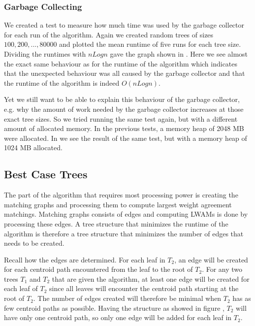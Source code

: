 \subsubsection{Garbage Collecting}
We created a test to measure how much time was used by the garbage collector for each run of the algorithm. Again we created random trees of sizes $100, 200, ..., 80000$ and plotted the mean runtime of five runs for each tree size. Dividing the runtimes with $nLogn$ gave the graph shown in . Here we see almost the exact same behaviour as for the runtime of the algorithm which indicates that the unexpected behaviour was all caused by the garbage collector and that the runtime of the algorithm is indeed $O(nLogn)$.

Yet we still want to be able to explain this behaviour of the garbage collector, e.g. why the amount of work needed by the garbage collector increases at those exact tree sizes. So we tried running the same test again, but with a different amount of allocated memory. In the previous tests, a memory heap of 2048 MB were allocated. In  we see the result of the same test, but with a memory heap of 1024 MB allocated.

\subsection{Best Case Trees}
The part of the algorithm that requires most processing power is creating the matching graphs and processing them to compute largest weight agreement matchings. Matching graphs consists of edges and computing LWAMs is done by processing these edges. A tree structure that minimizes the runtime of the algorithm is therefore a tree structure that minimizes the number of edges that needs to be created.

Recall how the edges are determined. For each leaf in $T_2$, an edge will be created for each centroid path encountered from the leaf to the root of $T_2$. For any two trees $T_1$ and $T_2$ that are given the algorithm, at least one edge will be created for each leaf of $T_2$ since all leaves will encounter the centroid path starting at the root of $T_2$. The number of edges created will therefore be minimal when $T_2$ has as few centroid paths as possible. Having the structure as showed in figure , $T_2$ will have only one centroid path, so only one edge will be added for each leaf in $T_2$.

